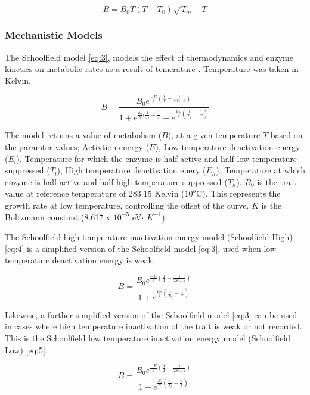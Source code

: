 \documentclass[11pt]{article}
\begin{document}
	\begin{equation}
	B = B_{0}T(T - T_0)\sqrt{T_{m} - T} \label{eq:2}
	\end{equation}
	
	\subsubsection{Mechanistic Models}
	The Schoolfield model \eqref{eq:3}, models the effect of thermodynamics and enzyme kinetics on metabolic rates as a result of temerature \cite{schoolfield1981non}. Temperature was taken in Kelvin. 
	
	\begin{equation}
	B = \frac{B_{0}e^{\frac{-E}{k}(\frac{1}{T} - \frac{1}{283.15})}} {1 + e^{\frac{E_{l}}{k}(\frac{1}{T_{l}} - \frac{1}{T}} + e^{\frac{E_{h}}{k}(\frac{1}{T_{h}} - \frac{1}{T})}}\label{eq:3}
	\end{equation}
	
	The model returns a value of metabolism (\(B\)), at a given temperature \(T\) based on the paramter values; Activtion energy (\(E\)), Low temperature deactivation energy (\(E_{l}\)), Temperature for which the enzyme is half active and half low temperature suppressed (\(T_{l}\)), High temperature deactivation enery (\(E_{h}\)), Temperature at which enzyme is half active and half high temperature suppressed (\(T_{h}\)). \(B_{0}\) is the trait value at reference temperature of 283.15 Kelvin ($10^{o}$C). This represents the growth rate at low temperature, controlling the offset of the curve. \(K\) is the Boltzmann constant (8.617 x $10^{-5}$ eV$\cdot$ $K^{-1}$). 
	
	The Schoolfield high temperature inactivation energy model (Schoolfield High) \eqref{eq:4} is a simplified version of the Schoolfield model \eqref{eq:3}, used when low temperature deactivation energy is weak. 
	
	\begin{equation}
	B = \frac{B_{0}e^{\frac{-E}{k}(\frac{1}{T} - \frac{1}{283.15})}} {1 + e^{\frac{E_{h}}{k}(\frac{1}{T_{h}} - \frac{1}{T})}}\label{eq:4}
	\end{equation}
	
	Likewise, a further simplified version of the Schoolfield model \eqref{eq:3} can be used in cases where high temperature inactivation of the trait is weak or not recorded. This is the Schoolfield low temperature inactivation energy model (Schoolfield Low) \eqref{eq:5}. 

	\begin{equation}
	B = \frac{B_{0}e^{\frac{-E}{k}(\frac{1}{T} - \frac{1}{283.15})}} {1 + e^{\frac{E_{l}}{k}(\frac{1}{T_{l}} - \frac{1}{T})}}\label{eq:5}
	\end{equation}
	
\end{document}
